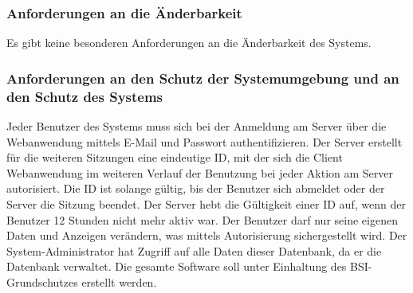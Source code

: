 \documentclass[a4paper,12pt,oneside]{scrartcl}
\begin{document}
\subsubsection{Anforderungen an die Änderbarkeit}
Es gibt keine besonderen Anforderungen an die Änderbarkeit des Systems.

\subsubsection{Anforderungen an den Schutz der Systemumgebung und an den Schutz des Systems}
Jeder Benutzer des Systems muss sich bei der Anmeldung am Server über die Webanwendung mittels E-Mail und Passwort authentifizieren.
Der Server erstellt für die weiteren Sitzungen eine eindeutige ID, mit der sich die Client Webanwendung im weiteren Verlauf der Benutzung bei jeder Aktion am Server autorisiert.
Die ID ist solange gültig, bis der Benutzer sich abmeldet oder der Server die Sitzung beendet.
Der Server hebt die Gültigkeit einer ID auf, wenn der Benutzer 12 Stunden nicht mehr aktiv war.
Der Benutzer darf nur seine eigenen Daten und Anzeigen verändern, was mittels Autorisierung sichergestellt wird.
Der System-Administrator hat Zugriff auf alle Daten dieser Datenbank, da er die Datenbank verwaltet.
Die gesamte Software soll unter Einhaltung des BSI-Grundschutzes erstellt werden.
\end{document}
